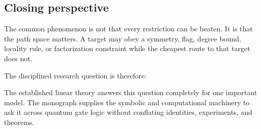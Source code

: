 \subsection{Closing perspective}
The common phenomenon is not that every restriction can be beaten.  It is that the path space matters.  A target may obey a symmetry, flag, degree bound, locality rule, or factorization constraint while the cheapest route to that target does not.

The disciplined research question is therefore:
\begin{center}
\end{center}
The established linear theory answers this question completely for one important model.  The monograph supplies the symbolic and computational machinery to ask it across quantum gate logic without conflating identities, experiments, and theorems.

